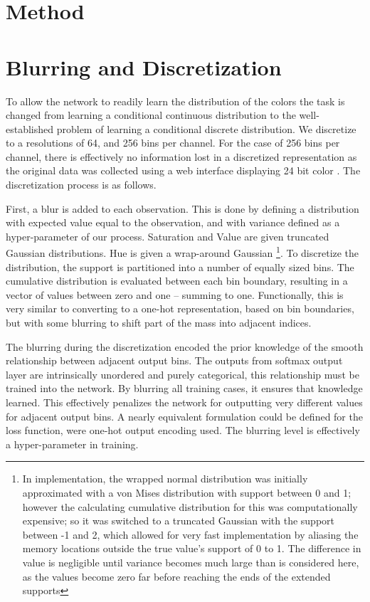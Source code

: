 \documentclass[11pt,letterpaper]{article}
\newcommand{\parencite}{\cite}
\begin{document}
\section{Method}

\section{Blurring and Discretization}
To allow the network to readily learn the distribution of the colors the task is changed from learning a conditional continuous distribution to the well-established problem of learning a conditional discrete distribution.
We discretize to a resolutions of 64, and 256 bins per channel.
For the case of 256 bins per channel, there is effectively no information lost in a discretized representation as the original data was collected using a web interface displaying 24 bit color \parencite{Monroe2010XKCDdataset}.
The discretization process is as follows.

First, a blur is added to each observation.
This is done by defining a distribution with expected value equal to the observation,
and with variance defined as a hyper-parameter of our process.
Saturation and Value are given truncated Gaussian distributions.
Hue is given a wrap-around Gaussian \footnote{In implementation, the wrapped normal distribution was initially approximated with a von Mises distribution with support between 0 and 1; however the calculating cumulative distribution for this was computationally expensive; so it was switched to a truncated Gaussian with the support between -1 and 2, which allowed for very fast implementation by aliasing the memory locations outside the true value's support of 0 to 1. The difference in value is negligible until variance becomes much large than is considered here, as the values become zero far before reaching the ends of the extended supports}.
To discretize the distribution, the support is partitioned into a number of equally sized bins.
The cumulative distribution is evaluated between each bin boundary, resulting in a vector of values between zero and one -- summing to one.
Functionally, this is very similar to converting to a one-hot representation, based on bin boundaries, but with some blurring to shift part of the mass into adjacent indices.

The blurring during the discretization encoded the prior knowledge of the smooth relationship between adjacent output bins.
The outputs from softmax output layer are intrinsically unordered and purely categorical, this relationship must be trained into the network.
By blurring all training cases, it ensures that knowledge learned.
This effectively penalizes the network for outputting very different values for adjacent output bins.
A nearly equivalent formulation could be defined for the loss function, were one-hot output encoding used.
The blurring level is effectively a hyper-parameter in training.
\end{document}
